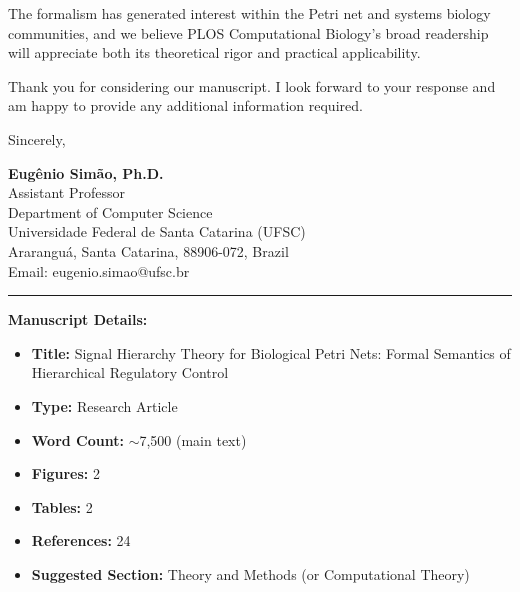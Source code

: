 \documentclass[11pt,letterpaper]{article}
\begin{document}
The formalism has generated interest within the Petri net and systems biology communities, and we believe PLOS Computational Biology's broad readership will appreciate both its theoretical rigor and practical applicability.

Thank you for considering our manuscript. I look forward to your response and am happy to provide any additional information required.

\vspace{24pt}

\noindent
Sincerely,

\vspace{24pt}

\noindent
\textbf{Eugênio Simão, Ph.D.}\\
Assistant Professor\\
Department of Computer Science\\
Universidade Federal de Santa Catarina (UFSC)\\
Araranguá, Santa Catarina, 88906-072, Brazil\\
Email: eugenio.simao@ufsc.br

\vspace{12pt}

\hrule

\vspace{12pt}

\noindent
\textbf{Manuscript Details:}
\begin{itemize}
\item \textbf{Title:} Signal Hierarchy Theory for Biological Petri Nets: Formal Semantics of Hierarchical Regulatory Control
\item \textbf{Type:} Research Article
\item \textbf{Word Count:} $\sim$7,500 (main text)
\item \textbf{Figures:} 2
\item \textbf{Tables:} 2
\item \textbf{References:} 24
\item \textbf{Suggested Section:} Theory and Methods (or Computational Theory)
\end{itemize}
\end{document}

